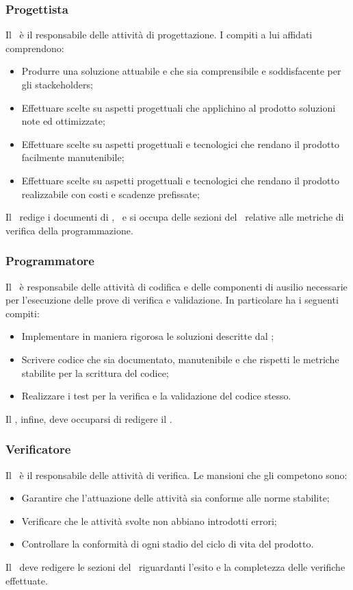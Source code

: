 \documentclass[../NormeProgetto.tex]{subfiles}
\begin{document}
		\subsubsection{Progettista}
		Il \progettista\ è il responsabile delle attività di progettazione. I compiti a lui affidati comprendono:
		\begin{itemize}
		\item Produrre una soluzione attuabile e che sia comprensibile e soddisfacente per gli stackeholders;
		\item Effettuare scelte su aspetti progettuali che applichino al prodotto soluzioni note ed ottimizzate;
		\item Effettuare scelte su aspetti progettuali e tecnologici che rendano il prodotto facilmente manutenibile;
		\item Effettuare scelte su aspetti progettuali e tecnologici che rendano il prodotto realizzabile con costi e scadenze prefissate;
		\end{itemize}
		Il \progettista\ redige i documenti di \specificatecnica, \ e si occupa delle sezioni del \pianodiqualifica\ relative alle metriche di verifica della programmazione.
		\subsubsection{Programmatore}
		Il \programmatore\ è responsabile delle attività di codifica e delle componenti di ausilio necessarie per l'esecuzione delle prove di verifica e validazione. In particolare ha i seguenti compiti:
		\begin{itemize}
		\item Implementare in maniera rigorosa le soluzioni descritte dal \progettista;
		\item Scrivere codice che sia documentato, manutenibile e che rispetti le metriche stabilite per la scrittura del codice;
		\item Realizzare i test per la verifica e la validazione del codice stesso.
		\end{itemize}
		Il \programmatore, infine, deve occuparsi di redigere il \manualeutente.
		\subsubsection{Verificatore}
		Il \verificatore\ è il responsabile delle attività di verifica. Le mansioni che gli competono sono:
		\begin{itemize}
		\item Garantire che l'attuazione delle attività sia conforme alle norme stabilite;
		\item Verificare che le attività svolte non abbiano introdotti errori;
		\item Controllare la conformità di ogni stadio del ciclo di vita del prodotto.
		\end{itemize}
		Il \verificatore\ deve redigere le sezioni del \pianodiqualifica\ riguardanti l'esito e la completezza delle verifiche effettuate.
\end{document}
